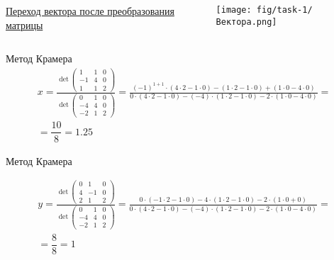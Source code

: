 
\begin{frame}
\begin{columns}
\begin{column}{0.5\paperwidth}
\begin{center}
\href{https://www.geogebra.org/calculator/hwswsnrm}{Переход вектора после преобразования матрицы}
\end{center}
\end{column}
\begin{column}{0.5\paperwidth}
\texttt{[image: fig/task-1/Вектора.png]} 
\end{column}
\end{columns}
\end{frame}


\begin{frame} {Метод Крамера}
\begin{multline*}
x=\frac{\det\left(\begin{array}{lll} 
1 & 1 & 0 \\
-1 & 4 & 0\\
1 & 1 & 2
\end{array}\right)}{\det\left(\begin{array}{lll} 
0 & 1 & 0 \\
-4 & 4 & 0\\
-2 & 1 & 2
\end{array}\right)}
=\frac{(-1)^{1+1}\cdot(4\cdot2 -1\cdot 0)-(1\cdot 2 - 1\cdot 0)+(1\cdot 0-4\cdot 0)}{0\cdot(4\cdot 2-1\cdot 0)-(-4)\cdot(1\cdot2-1\cdot0) -2\cdot(1\cdot 0 -4 \cdot 0)}=\\=\dfrac{10}{8}=1.25
\end{multline*}
\end{frame}
\begin{frame} {Метод Крамера}

\begin{multline*}
y=\frac{\det\left(\begin{array}{lll} 
0 & 1 & 0 \\
4 & -1 & 0\\
2 & 1 & 2
\end{array}\right)}{\det\left(\begin{array}{lll} 
0 & 1 & 0 \\
-4 & 4 & 0\\
-2 & 1 & 2
\end{array}\right)}
=\frac{0\cdot(-1\cdot 2 - 1 \cdot 0)-4\cdot(1\cdot2 -1\cdot0)-2\cdot(1\cdot 0+0)}{0\cdot(4\cdot 2-1\cdot 0)-(-4)\cdot(1\cdot2-1\cdot0) -2\cdot(1\cdot 0 -4 \cdot 0)}=\\=\dfrac{8}{8}=1\\
\end{multline*}
\end{frame}

